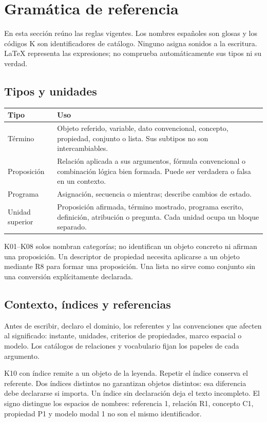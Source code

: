 \section{Gramática de referencia}\label{sec:gramatica}\label{sec:extension}

En esta sección reúno las reglas vigentes. Los nombres españoles son glosas y los
códigos K son identificadores de catálogo. Ninguno asigna sonidos a la escritura.
LaTeX representa las expresiones; no comprueba automáticamente sus tipos ni su verdad.

\subsection{Tipos y unidades}
\begin{longtable}{@{}p{29mm}>{\raggedright\arraybackslash}p{\dimexpr\linewidth-29mm-2\tabcolsep\relax}@{}}
\toprule Tipo & Uso \\ \midrule\endhead
Término & Objeto referido, variable, dato convencional, concepto, propiedad,
conjunto o lista. Sus subtipos no son intercambiables. \\[4pt]
Proposición & Relación aplicada a sus argumentos, fórmula convencional o
combinación lógica bien formada. Puede ser verdadera o falsa en un contexto. \\[4pt]
Programa & Asignación, secuencia o mientras; describe cambios de estado. \\[4pt]
Unidad superior & Proposición afirmada, término mostrado, programa escrito,
definición, atribución o pregunta. Cada unidad ocupa un bloque separado. \\[4pt]
\bottomrule
\end{longtable}
K01--K08 solos nombran categorías; no identifican un objeto concreto ni afirman
una proposición. Un descriptor de propiedad necesita aplicarse a un objeto
mediante R8 para formar una proposición. Una lista no sirve como conjunto sin
una conversión explícitamente declarada.

\subsection{Contexto, índices y referencias}
Antes de escribir, declaro el dominio, los referentes y las convenciones que
afecten al significado: instante, unidades, criterios de propiedades, marco
espacial o modelo. Los catálogos de relaciones y vocabulario fijan los papeles
de cada argumento.

K10 con índice remite a un objeto de la leyenda. Repetir el índice conserva el
referente. Dos índices distintos no garantizan objetos distintos: esa diferencia
debe declararse si importa. Un índice sin declaración deja el texto incompleto.
El signo distingue los espacios de nombres: referencia 1, relación R1,
concepto C1, propiedad P1 y modelo modal 1 no son el mismo identificador.

